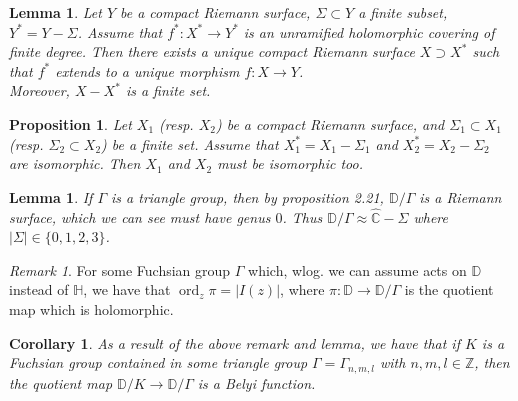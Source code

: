 \documentclass[reqno]{amsart}
\newtheorem{lemma}[theorem]{Lemma}
\newtheorem{proposition}[theorem]{Proposition}
\newtheorem{corollary}[theorem]{Corollary}
\theoremstyle{definition}
\theoremstyle{remark}
\newtheorem*{remark}{Remark}
\DeclareMathOperator{\ord}{ord}
\begin{document}
\begin{lemma}\label{covering-induces-RS-structure}
    Let $Y$ be a compact Riemann surface,
    $\Sigma \subset Y$ a finite subset, 
    $Y^* = Y - \Sigma$. Assume that
    $f^* \colon X^* \to Y^*$ is an
    unramified holomorphic covering
    of finite degree. Then there
    exists a unique compact Riemann
    surface $X \supset X^*$ such that
    $f^*$ extends to a unique morphism
    $f \colon X \to Y$.\\
    Moreover, $X - X^*$ is a finite
    set.
\end{lemma}

\begin{proposition}\label{RSiso}
    Let $X_1$ (resp. $X_2$) be a compact
    Riemann surface, and 
    $\Sigma_1 \subset X_1$ (resp. 
    $\Sigma_2 \subset X_2$) be a finite set. Assume that $X_1^* =
    X_1 - \Sigma_1$ and
    $X_2^* = X_2 - \Sigma_2$ are isomorphic. Then $X_1$ and
    $X_2$ must be isomorphic too.
\end{proposition}

\begin{lemma}
    If $\Gamma$ is a triangle group, then by proposition 2.21, $\mathbb{D}/\Gamma$ is a Riemann
    surface, which we can see must have genus $0$. Thus
    $\mathbb{D} / \Gamma \approx \hat{\mathbb{C}} - \Sigma$ where
    $\left| \Sigma \right| \in \{0, 1,2,3\}$.
\end{lemma}

\begin{remark}\label{order of point}
    For some Fuchsian group $\Gamma$ which, wlog. we can assume acts on $\mathbb{D}$ instead of 
    $\mathbb{H}$, we have that $\ord_z \pi = \left| I(z) \right|$, where
    $\pi \colon \mathbb{D} \to \mathbb{D} / \Gamma$ is the quotient map which is holomorphic.
\end{remark}

\begin{corollary}\label{fuchsian-triangle-induce-belyi}
    As a result of the above remark and lemma, we have that if $K$ is a Fuchsian group
contained in some triangle group $\Gamma = \Gamma_{n,m,l}$ with
$n,m,l \in \mathbb{Z}$, then the quotient map  $\mathbb{D}/K \to
\mathbb{D}/\Gamma$ is a Belyi function.
\end{corollary}
\end{document}
